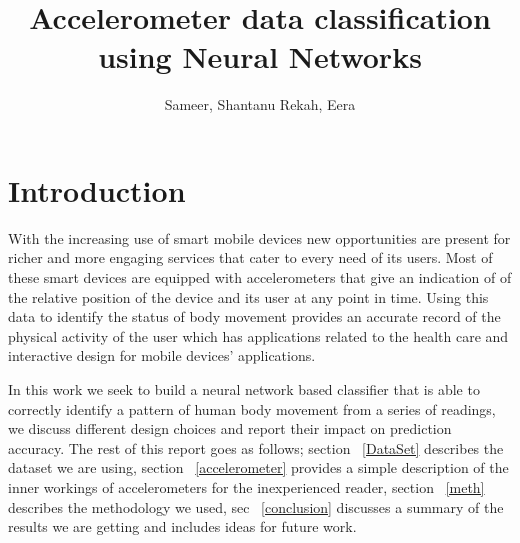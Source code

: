 \documentclass{article}
\title{Accelerometer data classification using Neural Networks}
\author{ Sameer, Shantanu Rekah, Eera}
\date{}
\begin{document}
\maketitle







\pagebreak
\tableofcontents

\pagebreak
\listoffigures

\pagebreak
\listoftables

\pagebreak

%
%
\section{Introduction}
\label{introduction}

With the increasing use of smart mobile devices new opportunities are present for richer and more engaging services 
that cater to every need of its users. Most of these smart devices are equipped with accelerometers that give an
indication of of the relative position of the device and its user at any point in time. Using this data to identify the 
status of body movement provides an accurate record of the physical activity of the user which has applications related 
to the health care and interactive design for mobile devices' applications. 

In this work we seek to build a neural network based classifier that is able to correctly identify a pattern of human body 
movement from a series of readings, we discuss different design choices and report their impact on prediction accuracy. The 
rest of this report goes as follows; section ~\ref{DataSet} describes the dataset we are using, section ~\ref{accelerometer} 
provides a simple description of the inner workings of accelerometers for the inexperienced reader, section ~\ref{meth} describes 
the methodology we used, sec ~\ref{conclusion} discusses a summary of the results we are getting and includes ideas for future work.
\end{document}
